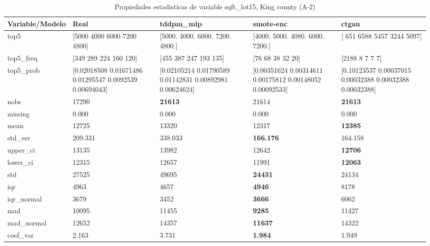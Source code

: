 \begin{table}[H]
\centering
\fontsize{8}{14}\selectfont
\caption{Propiedades  estadisticas de variable sqft\_lot15, King county (A-2)}
\label{table-stats-king county-a-2-sqft_lot15}
\begin{tabular}{|l|m{10em}|m{10em}|m{10em}|m{10em}|}
\hline
 \rowcolor[gray]{0.8}
Variable/Modelo & Real & tddpm\_mlp & smote-enc & ctgan \\
\hline top5 & [5000 4000 6000 7200 4800] & [5000. 4000. 6000. 7200. 4800.] & [4000. 5000. 4080. 6000. 7200.] & [ 651 6588 5457 3244 5097] \\
\hline top5\_freq & [349 289 224 160 120] & [455 387 247 193 135] & [76 68 38 32 20] & [2188    8    7    7    7] \\
\hline top5\_prob & [0.02018508 0.01671486 0.01295547 0.0092539  0.00694043] & [0.02105214 0.01790589 0.01142831 0.00892981 0.00624624] & [0.00351624 0.00314611 0.00175812 0.00148052 0.00092533] & [0.10123537 0.00037015 0.00032388 0.00032388 0.00032388] \\
\hline nobs & 17290 & \bfseries 21613 & \cellcolor[rgb]{0.9, 0.54, 0.52} 21614 & \bfseries 21613 \\
\hline missing & 0.000 & 0.000 & 0.000 & 0.000 \\
\hline mean & 12725 & \cellcolor[rgb]{0.9, 0.54, 0.52} 13320 & 12317 & \bfseries 12385 \\
\hline std\_err & 209.331 & \cellcolor[rgb]{0.9, 0.54, 0.52} 338.033 & \bfseries 166.176 & 164.158 \\
\hline upper\_ci & 13135 & \cellcolor[rgb]{0.9, 0.54, 0.52} 13982 & 12642 & \bfseries 12706 \\
\hline lower\_ci & 12315 & \cellcolor[rgb]{0.9, 0.54, 0.52} 12657 & 11991 & \bfseries 12063 \\
\hline std & 27525 & \cellcolor[rgb]{0.9, 0.54, 0.52} 49695 & \bfseries 24431 & 24134 \\
\hline iqr & 4963 & 4657 & \bfseries 4946 & \cellcolor[rgb]{0.9, 0.54, 0.52} 8178 \\
\hline iqr\_normal & 3679 & 3452 & \bfseries 3666 & \cellcolor[rgb]{0.9, 0.54, 0.52} 6062 \\
\hline mad & 10095 & \cellcolor[rgb]{0.9, 0.54, 0.52} 11455 & \bfseries 9285 & 11427 \\
\hline mad\_normal & 12652 & \cellcolor[rgb]{0.9, 0.54, 0.52} 14357 & \bfseries 11637 & 14322 \\
\hline coef\_var & 2.163 & \cellcolor[rgb]{0.9, 0.54, 0.52} 3.731 & \bfseries 1.984 & 1.949 \\

\end{tabular}
\end{table}

